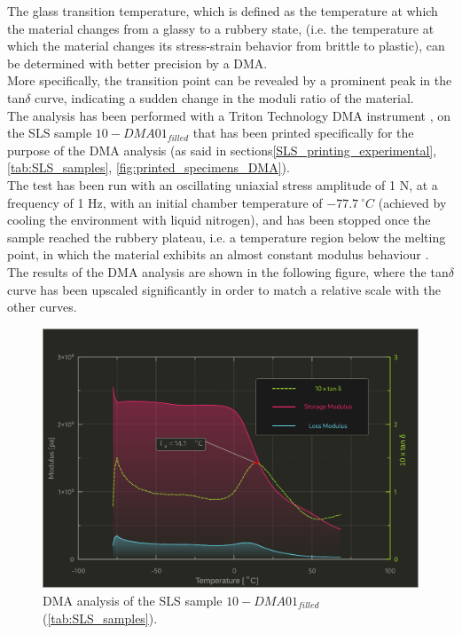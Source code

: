 \documentclass{article}
\begin{document}
    The glass transition temperature, which is defined as the temperature at which the material changes from a glassy to a rubbery state, 
    (i.e. the temperature at which the material changes its stress-strain behavior from brittle to plastic), can be determined with 
    better precision by a DMA. \\ 

    More specifically, the transition point can be revealed by a prominent peak in the tan$\delta$ curve, indicating a 
    sudden change in the moduli ratio of the material. \\ 
    
    The analysis has been performed with a Triton Technology DMA instrument \autocites{Triton_Technology_Ltd}, on the SLS sample 
    $10-DMA01_{filled}$ that has been printed specifically for the purpose of the DMA analysis 
    (as said in sections\ref{SLS_printing_experimental}, \ref{tab:SLS_samples}, \ref{fig:printed_specimens_DMA}). \\ 

    The test has been run with an oscillating uniaxial stress amplitude of 1 N, at a frequency of 1 Hz, with an initial 
    chamber temperature of $- 77.7 \ ^{\circ}C$ (achieved by cooling the environment with liquid nitrogen), and has been stopped 
    once the sample reached the rubbery plateau, i.e. a temperature region below the melting point, in which the material 
    exhibits an almost constant modulus behaviour \autocites{JD_Ferry_viscoelasticpolymers}. \\

    The results of the DMA analysis are shown in the following figure, where the tan$\delta$ curve has been upscaled significantly 
    in order to match a relative scale with the other curves. \\ 

    \begin{figure}[h!]
        \centering
        \includegraphics[width=\textwidth]{Pictures/Thermal_analysis_plots/DMA.eps}
        \caption{DMA analysis of the SLS sample $10-DMA01_{filled}$ (\ref{tab:SLS_samples}).}
        \label{fig:DMA_plot}
    \end{figure}
\end{document}
